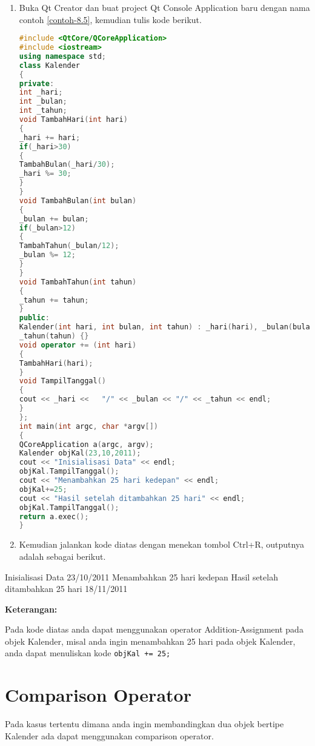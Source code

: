 \begin{enumerate}

\item
  Buka Qt Creator dan buat project Qt Console Application baru dengan
  nama contoh \ref{contoh-8.5}, kemudian tulis kode berikut.

\begin{lstlisting}[language=c++, caption= Menggunakan Addition Assigment Operator dan Substraction
Assigment Operator, label=contoh-8.5]
#include <QtCore/QCoreApplication>
#include <iostream>
using namespace std;
class Kalender
{
private:
int _hari;
int _bulan;
int _tahun;
void TambahHari(int hari)
{
_hari += hari;
if(_hari>30)
{
TambahBulan(_hari/30);
_hari %= 30;
}
}
void TambahBulan(int bulan)
{
_bulan += bulan;
if(_bulan>12)
{
TambahTahun(_bulan/12);
_bulan %= 12;
}
}
void TambahTahun(int tahun)
{
_tahun += tahun;
}
public:
Kalender(int hari, int bulan, int tahun) : _hari(hari), _bulan(bulan),
_tahun(tahun) {}
void operator += (int hari)
{
TambahHari(hari);
}
void TampilTanggal()
{
cout << _hari <<   "/" << _bulan << "/" << _tahun << endl;
}
};
int main(int argc, char *argv[])
{
QCoreApplication a(argc, argv);
Kalender objKal(23,10,2011);
cout << "Inisialisasi Data" << endl;
objKal.TampilTanggal();
cout << "Menambahkan 25 hari kedepan" << endl;
objKal+=25;
cout << "Hasil setelah ditambahkan 25 hari" << endl;
objKal.TampilTanggal();
return a.exec();
}
\end{lstlisting}
\item
  Kemudian jalankan kode diatas dengan menekan tombol Ctrl+R, outputnya
  adalah sebagai berikut.
\end{enumerate}

\begin{lcverbatim}
Inisialisasi Data
23/10/2011
Menambahkan 25 hari kedepan
Hasil setelah ditambahkan 25 hari
18/11/2011
\end{lcverbatim}

\textbf{Keterangan:}

Pada kode diatas anda dapat menggunakan operator Addition-Assignment
pada objek Kalender, misal anda ingin menambahkan 25 hari pada objek
Kalender, anda dapat menuliskan kode \texttt{objKal\ +=\ 25;}

\section{Comparison Operator}\label{comparison-operator}

Pada kasus tertentu dimana anda ingin membandingkan dua objek bertipe
Kalender ada dapat menggunakan comparison operator.

